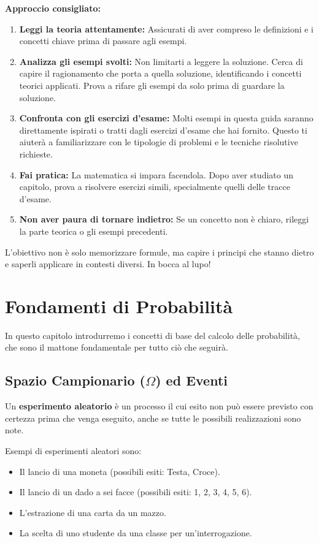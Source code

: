 \textbf{Approccio consigliato:}
\begin{enumerate}
    \item \textbf{Leggi la teoria attentamente:} Assicurati di aver compreso le definizioni e i concetti chiave prima di passare agli esempi.
    \item \textbf{Analizza gli esempi svolti:} Non limitarti a leggere la soluzione. Cerca di capire il ragionamento che porta a quella soluzione, identificando i concetti teorici applicati. Prova a rifare gli esempi da solo prima di guardare la soluzione.
    \item \textbf{Confronta con gli esercizi d'esame:} Molti esempi in questa guida saranno direttamente ispirati o tratti dagli esercizi d'esame che hai fornito. Questo ti aiuterà a familiarizzare con le tipologie di problemi e le tecniche risolutive richieste.
    \item \textbf{Fai pratica:} La matematica si impara facendola. Dopo aver studiato un capitolo, prova a risolvere esercizi simili, specialmente quelli delle tracce d'esame.
    \item \textbf{Non aver paura di tornare indietro:} Se un concetto non è chiaro, rileggi la parte teorica o gli esempi precedenti.
\end{enumerate}
L'obiettivo non è solo memorizzare formule, ma capire i principi che stanno dietro e saperli applicare in contesti diversi. In bocca al lupo!

\chapter{Fondamenti di Probabilità}
\label{cap:fondamenti}
In questo capitolo introdurremo i concetti di base del calcolo delle probabilità, che sono il mattone fondamentale per tutto ciò che seguirà.

\section{Spazio Campionario (\texorpdfstring{$\Omega$}{Omega}) ed Eventi}

\begin{definition}
Un \textbf{esperimento aleatorio} è un processo il cui esito non può essere previsto con certezza prima che venga eseguito, anche se tutte le possibili realizzazioni sono note.
\end{definition}

\begin{example}
Esempi di esperimenti aleatori sono:
\begin{itemize}
    \item Il lancio di una moneta (possibili esiti: Testa, Croce).
    \item Il lancio di un dado a sei facce (possibili esiti: 1, 2, 3, 4, 5, 6).
    \item L'estrazione di una carta da un mazzo.
    \item La scelta di uno studente da una classe per un'interrogazione.
\end{itemize}
\end{example}

